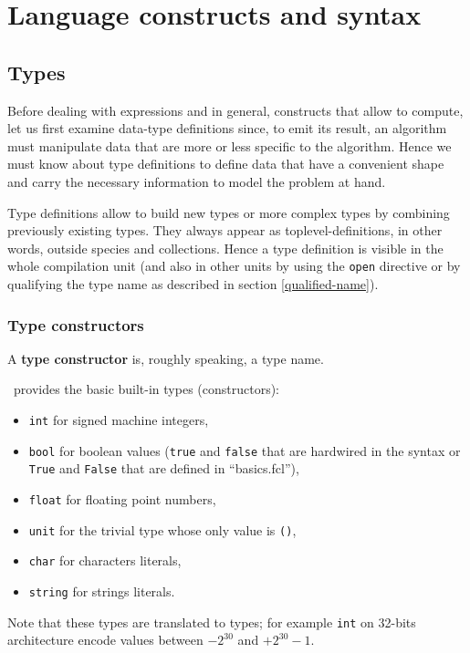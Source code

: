 

\section{Language constructs and syntax}
\subsection{Types}
Before dealing with expressions and in general, constructs that allow to
compute, let us first examine data-type definitions since, to emit its
result, an algorithm must manipulate data that are more or less specific to
the algorithm. Hence we must know about type definitions to define data that
have a convenient shape and carry the necessary information to model the
problem at hand.

Type definitions allow to build new types or more complex types by
combining previously existing types. They always appear as
toplevel-definitions, in other words, outside species and
collections. Hence a type definition is visible in the whole
compilation unit (and also in other units by using the {\tt open}
directive or by qualifying the type name as described in section
\ref{qualified-name}).

\subsubsection{Type constructors}
A {\bf type constructor} is, roughly speaking, a type name.

\focal\ provides the basic built-in
types (constructors):
\begin{itemize}
  \item {\tt int} for signed machine integers,
  \item {\tt bool} for boolean values ({\tt true} and {\tt false} that
    are hardwired in the syntax or {\tt True} and {\tt False} that are
    defined in ``basics.fcl''),
  \item {\tt float} for floating point numbers,
  \item {\tt unit} for the trivial type whose only value is {\tt ()},
  \item {\tt char} for characters literals,
  \item {\tt string} for strings literals.
\end{itemize}
Note that these types are translated to \ocaml types; for example
{\tt int} on 32-bits architecture encode values between $-2^{30}$
and $+2^{30}-1$.

